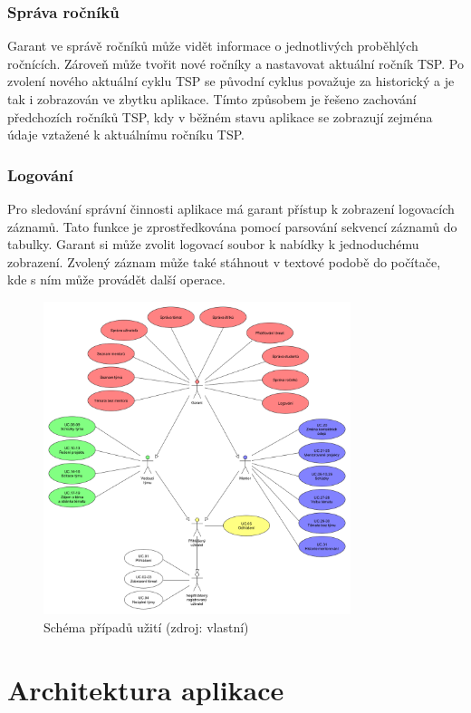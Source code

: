 \documentclass[czech,BP]{thesiskiv}
\begin{document}
			\subsubsection{Správa ročníků}
			\par Garant ve správě ročníků může vidět informace o jednotlivých proběhlých ročnících. Zároveň může tvořit nové ročníky a nastavovat aktuální ročník TSP. Po zvolení nového aktuální cyklu TSP se původní cyklus považuje za historický a je tak i zobrazován ve zbytku aplikace. Tímto způsobem je řešeno zachování předchozích ročníků TSP, kdy v běžném stavu aplikace se zobrazují zejména údaje vztažené k aktuálnímu ročníku TSP.
			\subsubsection{Logování}
			\par Pro sledování správní činnosti aplikace má garant přístup k zobrazení logovacích záznamů. Tato funkce je zprostředkována pomocí parsování sekvencí záznamů do tabulky. Garant si může zvolit logovací soubor k nabídky k jednoduchému zobrazení. Zvolený záznam může také stáhnout v textové podobě do počítače, kde s ním může provádět další operace.
		\begin{figure}[h]
			\centering
			\includegraphics[width=0.8\textwidth]{img/use_case/use_case_diagram}
			\caption{Schéma případů užití (zdroj: vlastní)}
			\label{fig:use-case}
		\end{figure}
	\section{Architektura aplikace}
\end{document}
